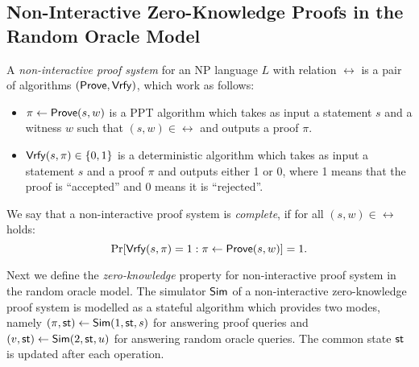 \subsection{Non-Interactive Zero-Knowledge Proofs in the Random Oracle Model}

\begin{definition} 
A \emph{non-interactive proof system} for an NP language $L$ with relation $\rel$ is a pair of algorithms $(\mathsf{Prove}, \mathsf{Vrfy})$, which work as follows:
\begin{itemize}
\item $\pi \leftarrow \mathsf{Prove}(s,w)$ is a PPT algorithm which takes as input a statement $s$ and a witness $w$ such that $(s,w) \in \rel$ and outputs a proof $\pi$.
\item $\mathsf{Vrfy}(s, \pi) \in \{0,1\}$ is a deterministic algorithm which takes as input a statement $s$ and a proof $\pi$ and outputs either 1 or 0, where 1 means that the proof is ``accepted'' and 0 means it is ``rejected''.
\end{itemize}
We say that a non-interactive proof system is \emph{complete}, if for all $(s, w) \in \rel$ holds:
\[\Pr[\mathsf{Vrfy}(s,\pi)=1:\pi \leftarrow \mathsf{Prove}(s,w)] =1.\] 
\end{definition}

Next we define the \emph{zero-knowledge} property for non-interactive proof system in the random oracle model. The simulator $\mathsf{Sim}$ of a non-interactive zero-knowledge proof system is modelled as a stateful algorithm which provides two modes, namely $(\pi, \mathsf{st}) \leftarrow \mathsf{Sim}(1, \mathsf{st}, s)$  for answering proof queries and $(v, \mathsf{st}) \leftarrow \mathsf{Sim}(2, \mathsf{st}, u)$ for answering random oracle queries. The common state $\mathsf{st}$ is updated after each operation.



